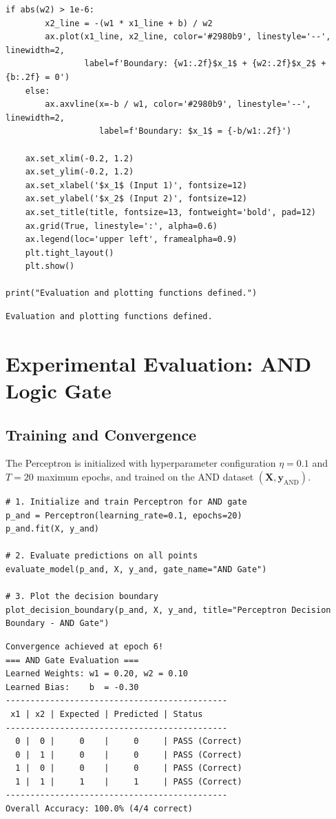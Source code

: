 \documentclass[12pt]{article}
\begin{document}
\begin{lstlisting}[style=code]
    if abs(w2) > 1e-6:
        x2_line = -(w1 * x1_line + b) / w2
        ax.plot(x1_line, x2_line, color='#2980b9', linestyle='--', linewidth=2,
                label=f'Boundary: {w1:.2f}$x_1$ + {w2:.2f}$x_2$ + {b:.2f} = 0')
    else:
        ax.axvline(x=-b / w1, color='#2980b9', linestyle='--', linewidth=2,
                   label=f'Boundary: $x_1$ = {-b/w1:.2f}')
        
    ax.set_xlim(-0.2, 1.2)
    ax.set_ylim(-0.2, 1.2)
    ax.set_xlabel('$x_1$ (Input 1)', fontsize=12)
    ax.set_ylabel('$x_2$ (Input 2)', fontsize=12)
    ax.set_title(title, fontsize=13, fontweight='bold', pad=12)
    ax.grid(True, linestyle=':', alpha=0.6)
    ax.legend(loc='upper left', framealpha=0.9)
    plt.tight_layout()
    plt.show()

print("Evaluation and plotting functions defined.")
\end{lstlisting}

\begin{lstlisting}[style=output]
Evaluation and plotting functions defined.
\end{lstlisting}

\newpage
\section{Experimental Evaluation: AND Logic Gate}

\subsection{Training and Convergence}
The Perceptron is initialized with hyperparameter configuration $\eta = 0.1$ and $T = 20$ maximum epochs, and trained on the AND dataset $(\mathbf{X}, \mathbf{y}_{\text{AND}})$.

\begin{lstlisting}[style=code]
# 1. Initialize and train Perceptron for AND gate
p_and = Perceptron(learning_rate=0.1, epochs=20)
p_and.fit(X, y_and)

# 2. Evaluate predictions on all points
evaluate_model(p_and, X, y_and, gate_name="AND Gate")

# 3. Plot the decision boundary
plot_decision_boundary(p_and, X, y_and, title="Perceptron Decision Boundary - AND Gate")
\end{lstlisting}

\begin{lstlisting}[style=output]
Convergence achieved at epoch 6!
=== AND Gate Evaluation ===
Learned Weights: w1 = 0.20, w2 = 0.10
Learned Bias:    b  = -0.30
---------------------------------------------
 x1 | x2 | Expected | Predicted | Status 
---------------------------------------------
  0 |  0 |     0    |     0     | PASS (Correct)
  0 |  1 |     0    |     0     | PASS (Correct)
  1 |  0 |     0    |     0     | PASS (Correct)
  1 |  1 |     1    |     1     | PASS (Correct)
---------------------------------------------
Overall Accuracy: 100.0% (4/4 correct)
\end{lstlisting}
\end{document}
